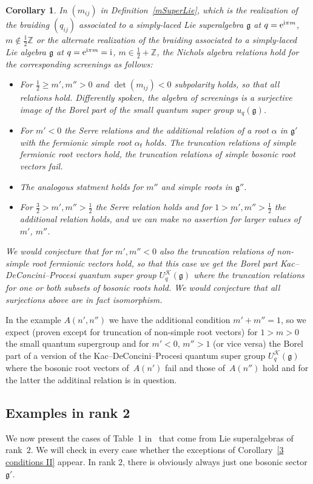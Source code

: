 \documentclass[pdftex]{sigma}%
\numberwithin{equation}{section}
\newtheorem{cor}[teo]{Corollary}
\newcommand{\Z}{\mathbb{Z}}
\newcommand{\g}{\mathfrak{g}}
\newcommand{\f}{\mathsf{f}}
\begin{document}
 \begin{cor}\label{cor_superNA}
 	In $(m_{ij})$ in Definition~{\rm \ref{mSuperLie}}, which is the realization of the braiding $(q_{ij})$ associated to a simply-laced Lie superalgebra $\g$ at $q={\rm e}^{{\rm i}\pi m}$, $m\not\in \frac{1}{2}\Z$ or the alternate realization of the braiding associated to a simply-laced Lie algebra $\g$ at $q={\rm e}^{{\rm i}\pi m}={\rm i}$, $m\in \frac{1}{2}+\Z$, the Nichols algebra relations hold for the corresponding screenings as follows:
 	\begin{itemize}\itemsep=0pt
 		\item For $\frac{1}{2}\geq m', m''>0$ and $\det(m_{ij})<0$ subpolarity holds, so that all relations hold. Differently spoken, the algebra of screenings is a surjective image of the Borel part of the small quantum super group $u_q(\g)$.
 		\item For $m'<0$ the Serre relations and the additional relation of a root $\alpha$ in $\g'$ with the fermionic simple root $\alpha_\f$ holds. The truncation relations of simple fermionic root vectors hold, the truncation relations of simple bosonic root vectors fail.
 		\item The analogous statment holds for $m''$ and simple roots in $\g''$.
 		\item For $\frac{3}{2}>m', m''>\frac{1}{2}$ the Serre relation holds and for $1>m',m''>\frac{1}{2}$ the additional relation holds, and we can make no assertion for larger values of $m'$, $m''$.
 	\end{itemize}
 	We would conjecture that for $m',m''<0$ also the truncation relations of non-simple root fermionic vectors hold, so that this case we get the Borel part Kac--DeConcini--Procesi quantum super group $U_q^\mathcal{K}(\g)$ where the truncation relations for one or both subsets of bosonic roots hold. We would conjecture that all surjections above are in fact isomorphism.
\end{cor}
In the example $A(n',n'')$ we have the additional condition $m'+m''=1$, so we expect (proven except for truncation of non-simple root vectors) for $1>m>0$ the small quantum supergroup and for $m'<0$, $m''>1$ (or vice versa) the Borel part of a version of the Kac--DeConcini--Procesi quantum super group $U_q^\mathcal{K}(\g)$ where the bosonic root vectors of~$A(n')$ fail and those of~$A(n'')$ hold and for the latter the additinal relation is in question.

\subsection{Examples in rank 2}\label{subsec_rank2super}
We now present the cases of Table~1 in~\cite{Hecklist} that come from Lie superalgebras of rank~$2$. We will check in every case whether the exceptions of Corollary~\ref{3 conditions II} appear.
In rank $2$, there is obviously always just one bosonic sector $\mathfrak{g'}$.
\end{document}
